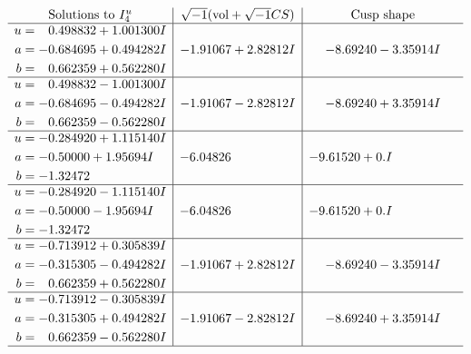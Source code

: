\documentclass[1p]{elsarticle_modified}
\theoremstyle{definition}
\newcommand{\I}{\sqrt{-1}}
\begin{document}
$$\begin{array}{c|c|c}  
\text{Solutions to }I^u_{4}& \I (\text{vol} + \sqrt{-1}CS) & \text{Cusp shape}\\
 \hline 
\begin{aligned}
u &= \phantom{-}0.498832 + 1.001300 I \\
a &= -0.684695 + 0.494282 I \\
b &= \phantom{-}0.662359 + 0.562280 I\end{aligned}
 & -1.91067 + 2.82812 I & -8.69240 - 3.35914 I \\ \hline\begin{aligned}
u &= \phantom{-}0.498832 - 1.001300 I \\
a &= -0.684695 - 0.494282 I \\
b &= \phantom{-}0.662359 - 0.562280 I\end{aligned}
 & -1.91067 - 2.82812 I & -8.69240 + 3.35914 I \\ \hline\begin{aligned}
u &= -0.284920 + 1.115140 I \\
a &= -0.50000 + 1.95694 I \\
b &= -1.32472\phantom{ +0.000000I}\end{aligned}
 & -6.04826\phantom{ +0.000000I} & -9.61520 + 0. I\phantom{ +0.000000I} \\ \hline\begin{aligned}
u &= -0.284920 - 1.115140 I \\
a &= -0.50000 - 1.95694 I \\
b &= -1.32472\phantom{ +0.000000I}\end{aligned}
 & -6.04826\phantom{ +0.000000I} & -9.61520 + 0. I\phantom{ +0.000000I} \\ \hline\begin{aligned}
u &= -0.713912 + 0.305839 I \\
a &= -0.315305 - 0.494282 I \\
b &= \phantom{-}0.662359 + 0.562280 I\end{aligned}
 & -1.91067 + 2.82812 I & -8.69240 - 3.35914 I \\ \hline\begin{aligned}
u &= -0.713912 - 0.305839 I \\
a &= -0.315305 + 0.494282 I \\
b &= \phantom{-}0.662359 - 0.562280 I\end{aligned}
 & -1.91067 - 2.82812 I & -8.69240 + 3.35914 I\\
 \hline 
 \end{array}$$\newpage\newpage\renewcommand{\arraystretch}{1}
\end{document}
